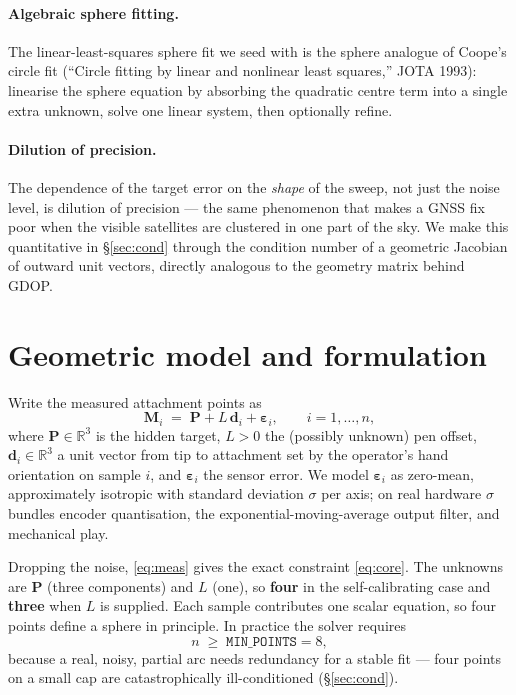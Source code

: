 \documentclass[11pt,a4paper]{article}
\newcommand{\M}{\mathbf{M}}
\newcommand{\bP}{\mathbf{P}}
\newcommand{\bd}{\mathbf{d}}
\newcommand{\beps}{\boldsymbol{\varepsilon}}
\newcommand{\R}{\mathbb{R}}
\begin{document}
\paragraph{Algebraic sphere fitting.}
The linear-least-squares sphere fit we seed with is the sphere analogue of Coope's
circle fit (``Circle fitting by linear and nonlinear least squares,'' JOTA 1993):
linearise the sphere equation by absorbing the quadratic centre term into a single
extra unknown, solve one linear system, then optionally refine.

\paragraph{Dilution of precision.}
The dependence of the target error on the \emph{shape} of the sweep, not just the
noise level, is dilution of precision --- the same phenomenon that makes a GNSS fix
poor when the visible satellites are clustered in one part of the sky. We make this
quantitative in \S\ref{sec:cond} through the condition number of a geometric
Jacobian of outward unit vectors, directly analogous to the geometry matrix behind
GDOP.

\section{Geometric model and formulation}
\label{sec:model}

Write the measured attachment points as
\begin{equation}
  \M_i \;=\; \bP + L\,\bd_i + \beps_i, \qquad i = 1,\dots,n,
  \label{eq:meas}
\end{equation}
where $\bP \in \R^3$ is the hidden target, $L>0$ the (possibly unknown) pen offset,
$\bd_i \in \R^3$ a unit vector from tip to attachment set by the operator's hand
orientation on sample $i$, and $\beps_i$ the sensor error. We model $\beps_i$ as
zero-mean, approximately isotropic with standard deviation $\sigma$ per axis; on
real hardware $\sigma$ bundles encoder quantisation, the exponential-moving-average
output filter, and mechanical play.

Dropping the noise, \eqref{eq:meas} gives the exact constraint \eqref{eq:core}. The
unknowns are $\bP$ (three components) and $L$ (one), so \textbf{four} in the
self-calibrating case and \textbf{three} when $L$ is supplied. Each sample
contributes one scalar equation, so four points define a sphere in principle. In
practice the solver requires
\[
  n \;\ge\; \texttt{MIN\_POINTS} = 8,
\]
because a real, noisy, partial arc needs redundancy for a stable fit --- four points
on a small cap are catastrophically ill-conditioned (\S\ref{sec:cond}).
\end{document}
